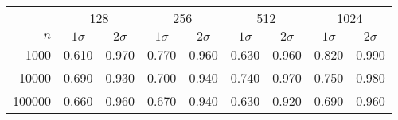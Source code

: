 \begin{tabular}{r cc cc cc cc}
\toprule
 & \multicolumn{2}{c}{128} & \multicolumn{2}{c}{256} & \multicolumn{2}{c}{512} & \multicolumn{2}{c}{1024} \\
$n$  & $1\sigma$ & $2\sigma$ & $1\sigma$ & $2\sigma$ & $1\sigma$ & $2\sigma$ & $1\sigma$ & $2\sigma$ \\
\midrule
1000 & 0.610 & 0.970 & 0.770 & 0.960 & 0.630 & 0.960 & 0.820 & 0.990 \\
10000 & 0.690 & 0.930 & 0.700 & 0.940 & 0.740 & 0.970 & 0.750 & 0.980 \\
100000 & 0.660 & 0.960 & 0.670 & 0.940 & 0.630 & 0.920 & 0.690 & 0.960 \\
\bottomrule
\end{tabular}